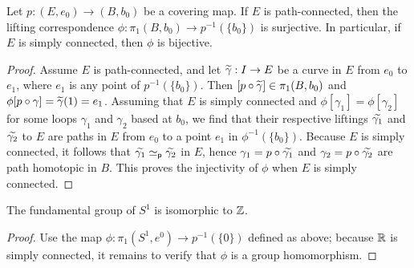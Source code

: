\begin{thm}
    Let $p: (E, e_0)\rightarrow (B, b_0)$ be a covering map.
    If $E$ is path-connected, then the lifting correspondence $\phi: \pi_1(B, b_0)\rightarrow p^{-1}(\{b_0\})$ is surjective.
    In particular, if $E$ is simply connected, then $\phi$ is bijective.
\end{thm}
\begin{proof}
    Assume $E$ is path-connected, and let $\widetilde{\gamma}: I\rightarrow E$ be a curve in $E$ from $e_0$ to $e_1$, where $e_1$ is any point of $p^{-1}(\{b_0\})$.
    Then $[p\circ\widetilde{\gamma}]\in \pi_1(B, b_0)$ and $\phi[p\circ\gamma]=\widetilde{\gamma}(1)=e_1$.
    Assuming that $E$ is simply connected and $\phi[\gamma_1]=\phi[\gamma_2]$ for some loops $\gamma_1$ and $\gamma_2$ based at $b_0$, we find that their respective liftings $\widetilde{\gamma_1}$ and $\widetilde{\gamma_2}$ to $E$ are paths in $E$ from $e_0$ to a point $e_1$ in $\phi^{-1}(\{b_0\})$.
    Because $E$ is simply connected, it follows that $\widetilde{\gamma_1}\simeq_\textsf{p}\widetilde{\gamma_2}$ in $E$, hence $\gamma_1=p\circ\widetilde{\gamma_1}$ and $\gamma_2=p\circ\widetilde{\gamma_2}$ are path homotopic in $B$.
    This proves the injectivity of $\phi$ when $E$ is simply connected.
\end{proof}

\begin{thm}
    The fundamental group of $S^1$ is isomorphic to ${\mathbb{Z}}$.
\end{thm}
\begin{proof}
    \color{brown}Use the map $\phi: \pi_1(S^1, e^0)\rightarrow p^{-1}(\{0\})$ defined as above; because ${\mathbb{R}}$ is simply connected, it remains to verify that $\phi$ is a group homomorphism.\color{black}
\end{proof}

